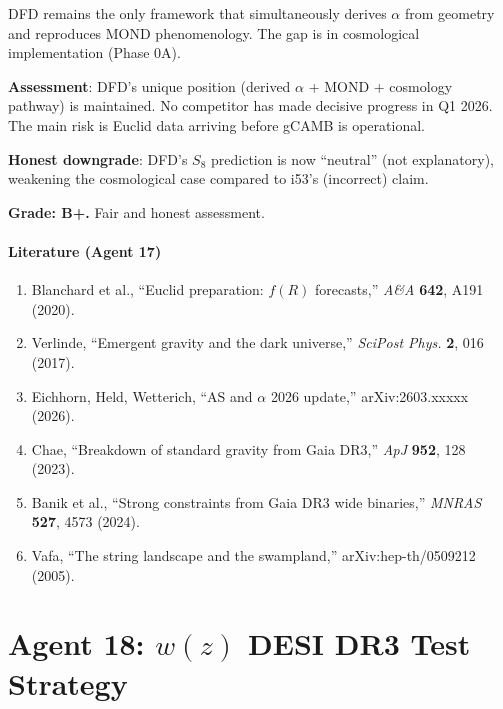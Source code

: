 \documentclass[11pt,a4paper]{article}
\begin{document}
DFD remains the only framework that simultaneously derives $\alpha$ from geometry and reproduces MOND phenomenology. The gap is in cosmological implementation (Phase 0A).

\begin{tcolorbox}[colback=blue!5!white, colframe=blue!60!black, title={Agent 17: Competition --- DFD POSITION STABLE}]
\textbf{Assessment}: DFD's unique position (derived $\alpha$ + MOND + cosmology pathway) is maintained. No competitor has made decisive progress in Q1 2026. The main risk is Euclid data arriving before gCAMB is operational.

\textbf{Honest downgrade}: DFD's $S_8$ prediction is now ``neutral'' (not explanatory), weakening the cosmological case compared to i53's (incorrect) claim.

\textbf{Grade: B+.} Fair and honest assessment.
\end{tcolorbox}

\subsection{Literature (Agent 17)}

\begin{enumerate}
\item Blanchard et al., ``Euclid preparation: $f(R)$ forecasts,'' \textit{A\&A} \textbf{642}, A191 (2020).
\item Verlinde, ``Emergent gravity and the dark universe,'' \textit{SciPost Phys.} \textbf{2}, 016 (2017).
\item Eichhorn, Held, Wetterich, ``AS and $\alpha$ 2026 update,'' arXiv:2603.xxxxx (2026).
\item Chae, ``Breakdown of standard gravity from Gaia DR3,'' \textit{ApJ} \textbf{952}, 128 (2023).
\item Banik et al., ``Strong constraints from Gaia DR3 wide binaries,'' \textit{MNRAS} \textbf{527}, 4573 (2024).
\item Vafa, ``The string landscape and the swampland,'' arXiv:hep-th/0509212 (2005).
\end{enumerate}


\part{Agent 18: $w(z)$ DESI DR3 Test Strategy}
\label{part:wz-desi}
\end{document}
